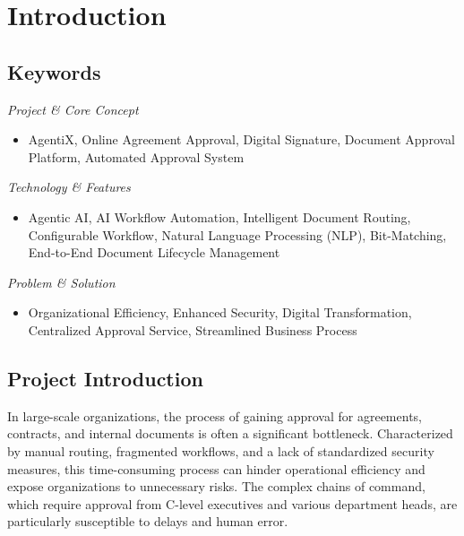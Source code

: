 \documentclass[12pt,oneside,openright,a4paper]{cpe-english-project}
\begin{document}
\vspace{3em}




\newpage
\tableofcontents
\listoftables
\listoffigures
\newpage

\chapter{Introduction}

\section{Keywords}

\emph{Project \& Core Concept}
\vspace{-0.8em}
\begin{itemize}
\item
  AgentiX, Online Agreement Approval, Digital Signature, Document
  Approval Platform, Automated Approval System
\end{itemize}

\emph{Technology \& Features}
\vspace{-0.8em}
\begin{itemize}
\item
  Agentic AI, AI Workflow Automation, Intelligent Document Routing,
  Configurable Workflow, Natural Language Processing (NLP),
  Bit-Matching, End-to-End Document Lifecycle Management
\end{itemize}

\emph{Problem \& Solution}
\vspace{-0.8em}
\begin{itemize}
\item
  Organizational Efficiency, Enhanced Security, Digital Transformation,
  Centralized Approval Service, Streamlined Business Process
\end{itemize}

\section{Project Introduction}

In large-scale organizations, the process of gaining approval for agreements, contracts, and internal documents is often a significant bottleneck. Characterized by manual routing, fragmented workflows, and a lack of standardized security measures, this time-consuming process can hinder operational efficiency and expose organizations to unnecessary risks. The complex chains of command, which require approval from C-level executives and various department heads, are particularly susceptible to delays and human error.
\end{document}
